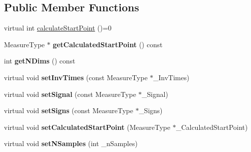 \subsection*{Public Member Functions}
\begin{DoxyCompactItemize}
\item 
virtual int \hyperlink{class_ox_1_1_start_point_calculator_a9d1132410d68eb16f3f71ec4015c0b2f}{calculate\-Start\-Point} ()=0
\item 
\hypertarget{class_ox_1_1_start_point_calculator_a48b39c1d6bb733821f7297593e424728}{Measure\-Type $\ast$ {\bfseries get\-Calculated\-Start\-Point} () const }\label{class_ox_1_1_start_point_calculator_a48b39c1d6bb733821f7297593e424728}

\item 
\hypertarget{class_ox_1_1_start_point_calculator_a75c73487e21a0f4920762c1efc96d573}{int {\bfseries get\-N\-Dims} () const }\label{class_ox_1_1_start_point_calculator_a75c73487e21a0f4920762c1efc96d573}

\item 
\hypertarget{class_ox_1_1_start_point_calculator_a0632bd0dcf7707930058d63e2176fc7a}{virtual void {\bfseries set\-Inv\-Times} (const Measure\-Type $\ast$\-\_\-\-Inv\-Times)}\label{class_ox_1_1_start_point_calculator_a0632bd0dcf7707930058d63e2176fc7a}

\item 
\hypertarget{class_ox_1_1_start_point_calculator_a21beb5845568afe488bb5d4e6d4176bb}{virtual void {\bfseries set\-Signal} (const Measure\-Type $\ast$\-\_\-\-Signal)}\label{class_ox_1_1_start_point_calculator_a21beb5845568afe488bb5d4e6d4176bb}

\item 
\hypertarget{class_ox_1_1_start_point_calculator_a1245375d6cad369f18ab4a32ddb28446}{virtual void {\bfseries set\-Signs} (const Measure\-Type $\ast$\-\_\-\-Signs)}\label{class_ox_1_1_start_point_calculator_a1245375d6cad369f18ab4a32ddb28446}

\item 
\hypertarget{class_ox_1_1_start_point_calculator_aebb0511e802eff920369dec99b6c00fb}{virtual void {\bfseries set\-Calculated\-Start\-Point} (Measure\-Type $\ast$\-\_\-\-Calculated\-Start\-Point)}\label{class_ox_1_1_start_point_calculator_aebb0511e802eff920369dec99b6c00fb}

\item 
\hypertarget{class_ox_1_1_start_point_calculator_a72195ac7840734cd9001d0303ab859f4}{virtual void {\bfseries set\-N\-Samples} (int \-\_\-n\-Samples)}\label{class_ox_1_1_start_point_calculator_a72195ac7840734cd9001d0303ab859f4}


\end{DoxyCompactItemize}
